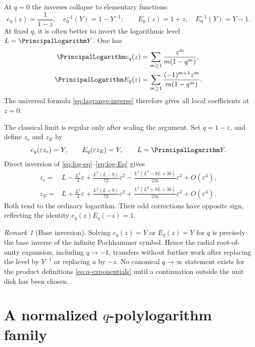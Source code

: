 \documentclass[11pt,a4paper,oneside,openany]{book}
\theoremstyle{definition}
\theoremstyle{remark}
\newtheorem{remark}[theorem]{Remark}
\newcommand{\eps}{\varepsilon}
\begin{document}
At \(q=0\) the inverses collapse to elementary functions:
\begin{equation}\label{eq:q-exponential-qzero}
 e_0(z)=\frac1{1-z},\quad e_0^{-1}(Y)=1-Y^{-1};
 \qquad
 E_0(z)=1+z,\quad E_0^{-1}(Y)=Y-1.
\end{equation}
At fixed \(q\), it is often better to invert the logarithmic level
\(L=\PrincipalLogarithm Y\).  One has
\begin{align}
 \PrincipalLogarithm e_q(z)&=\sum_{m\ge1}\frac{z^m}{m(1-q^m)},\label{eq:log-eq}\\
 \PrincipalLogarithm E_q(z)&=\sum_{m\ge1}\frac{(-1)^{m+1}z^m}{m(1-q^m)}.
 \label{eq:log-Eq}
\end{align}
The universal formula \eqref{eq:lagrange-inverse} therefore gives all local
coefficients at \(z=0\).

The classical limit is regular only after scaling the argument.  Set
\(q=1-\eps\), and define \(z_e\) and \(z_E\) by
\begin{equation}\label{eq:scaled-qexp-inverse-def}
 e_q(\eps z_e)=Y,
 \qquad E_q(\eps z_E)=Y,
 \qquad L=\PrincipalLogarithm Y.
\end{equation}
Direct inversion of \eqref{eq:log-eq}--\eqref{eq:log-Eq} gives
\begin{align}
 z_e={}&L-\frac{L^2}{4}\eps
 +\frac{L^2(L-9)}{72}\eps^2
 -\frac{L^2(L^2-8L+36)}{576}\eps^3+O(\eps^4),
 \label{eq:scaled-eq-inverse}\\
 z_E={}&L+\frac{L^2}{4}\eps
 +\frac{L^2(L+9)}{72}\eps^2
 +\frac{L^2(L^2+8L+36)}{576}\eps^3+O(\eps^4).
 \label{eq:scaled-Eq-inverse}
\end{align}
Both tend to the ordinary logarithm.  Their odd corrections have opposite
sign, reflecting the identity \(e_q(z)E_q(-z)=1\).

\begin{remark}[Base inversion]
Solving \(e_q(z)=Y\) or \(E_q(z)=Y\) for \(q\) is precisely the base inverse
of the infinite Pochhammer symbol.  Hence the radial root-of-unity expansion,
including \(q\to-1\), transfers without further work after replacing the
level by \(Y^{-1}\) or replacing \(a\) by \(-z\).  No canonical
\(q\to\infty\) statement exists for the product definitions
\eqref{eq:q-exponentials} until a continuation outside the unit disk has been
chosen.
\end{remark}

\section{A normalized \texorpdfstring{$q$}{q}-polylogarithm family}
\end{document}

